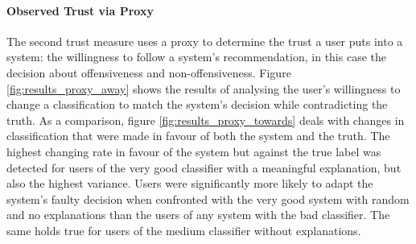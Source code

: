 \paragraph{Observed Trust via Proxy}
The second trust measure uses a proxy to determine the trust a user puts into a system: the willingness to follow a system's recommendation, in this case the decision about offensiveness and non-offensiveness. Figure \ref{fig:results_proxy_away} shows the results of analysing the user's willingness to change a classification to match the system's decision while contradicting the truth. As a comparison, figure \ref{fig:results_proxy_towards} deals with changes in classification that were made in favour of both the system and the truth.\newline
The highest changing rate in favour of the system but against the true label was detected for users of the very good classifier with a meaningful explanation, but also the highest variance. Users were significantly more likely to adapt the system's faulty decision when confronted with the very good system with random and no explanations than the users of any system with the bad classifier. The same holds true for users of the medium classifier without explanations.\newline
